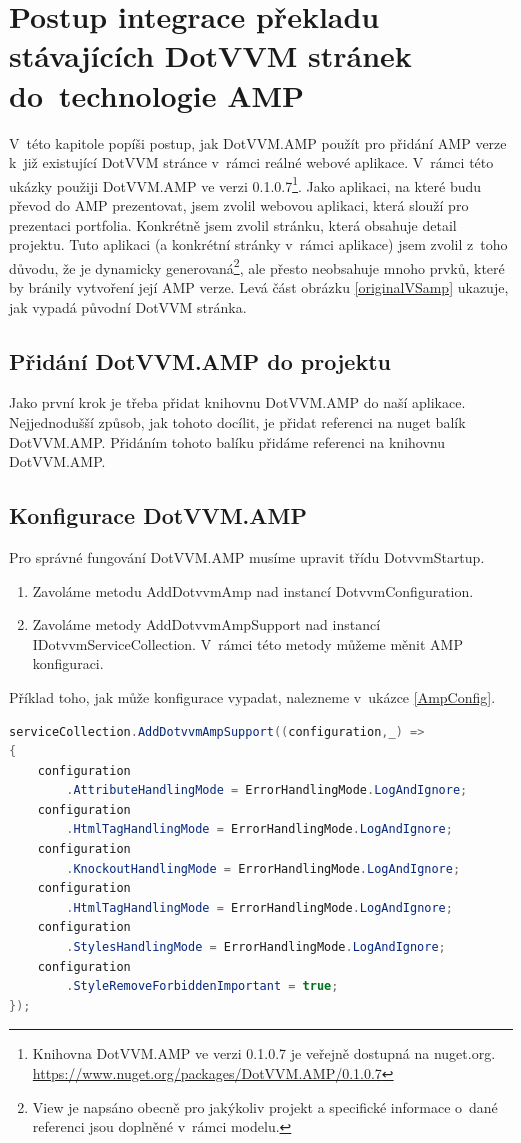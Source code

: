 \chapter{Postup integrace překladu stávajících DotVVM stránek do~technologie AMP}
V~této kapitole popíši postup, jak DotVVM.AMP použít pro přidání AMP verze k~již existující DotVVM stránce v~rámci reálné webové aplikace. V~rámci této ukázky použiji DotVVM.AMP ve verzi 0.1.0.7\footnote{\label{nuget}Knihovna DotVVM.AMP ve verzi 0.1.0.7 je veřejně dostupná na nuget.org.\newline
\url{https://www.nuget.org/packages/DotVVM.AMP/0.1.0.7}}. Jako aplikaci, na které budu převod do AMP prezentovat, jsem zvolil webovou aplikaci, která slouží pro prezentaci portfolia. Konkrétně jsem zvolil stránku, která obsahuje detail projektu. Tuto aplikaci (a konkrétní stránky v~rámci aplikace) jsem zvolil z~toho důvodu, že je dynamicky generovaná\footnote{View je napsáno obecně pro jakýkoliv projekt a specifické informace o~dané referenci jsou doplněné v~rámci modelu. }, ale přesto neobsahuje mnoho prvků, které by bránily vytvoření její AMP verze. Levá část obrázku \ref{originalVSamp} ukazuje, jak vypadá původní DotVVM stránka.

\section{Přidání DotVVM.AMP do projektu}
Jako první krok je třeba přidat knihovnu DotVVM.AMP do naší aplikace. Nejjednodušší způsob, jak tohoto docílit, je přidat referenci na nuget balík DotVVM.AMP. Přidáním tohoto balíku přidáme referenci na knihovnu DotVVM.AMP.
\section*{Konfigurace DotVVM.AMP}
Pro správné fungování DotVVM.AMP musíme upravit třídu DotvvmStartup.
\begin{enumerate}
    \item  Zavoláme metodu AddDotvvmAmp nad instancí DotvvmConfiguration.
    \item Zavoláme metody AddDotvvmAmpSupport nad instancí IDotvvmServiceCollection.\newline
    V~rámci této metody můžeme měnit AMP konfiguraci.
\end{enumerate}
Příklad toho, jak může konfigurace vypadat, nalezneme v~ukázce \ref{AmpConfig}.

\begin{lstlisting}[language=c#, caption=Ukázka možné AMP konfigurace,label=AmpConfig,captionpos=t]
serviceCollection.AddDotvvmAmpSupport((configuration,_) =>
{
	configuration
	    .AttributeHandlingMode = ErrorHandlingMode.LogAndIgnore;
	configuration
	    .HtmlTagHandlingMode = ErrorHandlingMode.LogAndIgnore;
	configuration
	    .KnockoutHandlingMode = ErrorHandlingMode.LogAndIgnore;
	configuration
	    .HtmlTagHandlingMode = ErrorHandlingMode.LogAndIgnore;
	configuration
	    .StylesHandlingMode = ErrorHandlingMode.LogAndIgnore;
	configuration
	    .StyleRemoveForbiddenImportant = true;
});
\end{lstlisting}

